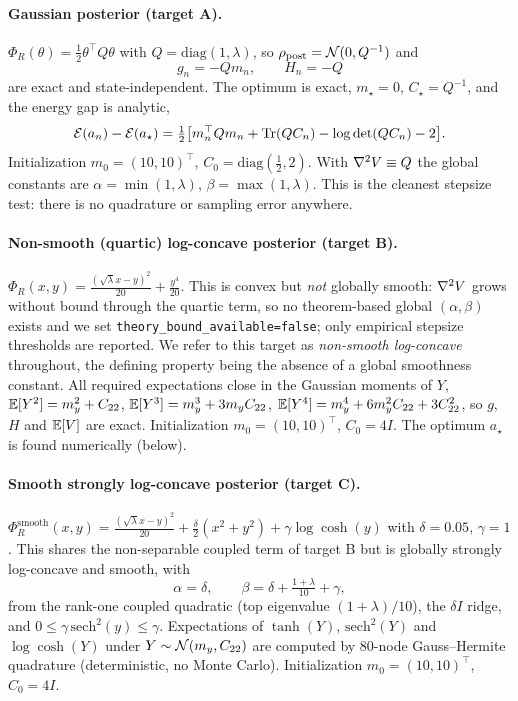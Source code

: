 \documentclass[11pt]{article}
\begin{document}
\paragraph{Gaussian posterior (target A).}
$\Phi_R(\theta)=\tfrac12\theta^\top Q\theta$ with $Q=\mathrm{diag}(1,\lambda)$, so
$\rho_{\mathrm{post}}=\mathcal{N}(0,Q^{-1})$ and
\begin{equation}
g_n=-Qm_n,\qquad H_n=-Q
\end{equation}
are exact and state-independent. The optimum is exact, $m_\star=0$,
$C_\star=Q^{-1}$, and the energy gap is analytic,
\begin{equation}\label{eq:gauss-gap}
\mathcal{E}(a_n)-\mathcal{E}(a_\star)=\tfrac12\big[m_n^\top Qm_n+\operatorname{Tr}(QC_n)-\log\det(QC_n)-2\big].
\end{equation}
Initialization $m_0=(10,10)^\top$, $C_0=\mathrm{diag}(\tfrac12,2)$. With
$\nabla^2 V\equiv Q$ the global constants are $\alpha=\min(1,\lambda)$,
$\beta=\max(1,\lambda)$. This is the cleanest stepsize test: there is no
quadrature or sampling error anywhere.

\paragraph{Non-smooth (quartic) log-concave posterior (target B).}
$\Phi_R(x,y)=\tfrac{(\sqrt\lambda x-y)^2}{20}+\tfrac{y^4}{20}$. This is convex but
\emph{not} globally smooth: $\nabla^2 V$ grows without bound through the quartic
term, so no theorem-based global $(\alpha,\beta)$ exists and we set
\texttt{theory\_bound\_available=false}; only empirical stepsize thresholds are
reported. We refer to this target as \emph{non-smooth log-concave} throughout, the
defining property being the absence of a global smoothness constant. All required
expectations close in the Gaussian moments of $Y$,
$\mathbb{E}[Y^2]=m_y^2+C_{22}$, $\mathbb{E}[Y^3]=m_y^3+3m_yC_{22}$,
$\mathbb{E}[Y^4]=m_y^4+6m_y^2C_{22}+3C_{22}^2$, so $g$, $H$ and $\mathbb{E}[V]$ are exact.
Initialization $m_0=(10,10)^\top$, $C_0=4I$. The optimum $a_\star$ is found
numerically (below).

\paragraph{Smooth strongly log-concave posterior (target C).}
$\Phi_R^{\mathrm{smooth}}(x,y)=\tfrac{(\sqrt\lambda x-y)^2}{20}
+\tfrac{\delta}{2}(x^2+y^2)+\gamma\log\cosh(y)$ with $\delta=0.05$, $\gamma=1$.
This shares the non-separable coupled term of target B but is globally strongly
log-concave and smooth, with
\begin{equation}
\alpha=\delta,\qquad \beta=\delta+\tfrac{1+\lambda}{10}+\gamma,
\end{equation}
from the rank-one coupled quadratic (top eigenvalue $(1+\lambda)/10$), the
$\delta I$ ridge, and $0\le\gamma\,\mathrm{sech}^2(y)\le\gamma$. Expectations of
$\tanh(Y)$, $\mathrm{sech}^2(Y)$ and $\log\cosh(Y)$ under $Y\sim\mathcal{N}(m_y,C_{22})$
are computed by $80$-node Gauss--Hermite quadrature (deterministic, no Monte
Carlo). Initialization $m_0=(10,10)^\top$, $C_0=4I$.
\end{document}
